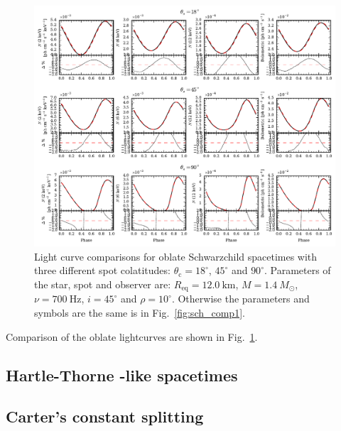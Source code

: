 \documentclass[iop, usenatbib]{emulateapj}
\newcommand{\Msun}{\ensuremath{M_{\odot}}}
\begin{document}
\begin{figure}
\centering
\includegraphics[width=18cm]{figs/fig4.pdf}
\caption{\label{fig:osch_comp700}
  Light curve comparisons for oblate Schwarzchild spacetimes with three different spot colatitudes: $\theta_{\mathrm{c}} = 18^{\circ}$, $45^{\circ}$ and $90^{\circ}$.
  Parameters of the star, spot and observer are: $R_{\mathrm{eq}} = 12.0~\mathrm{km}$, $M = 1.4~\Msun$, $\nu = 700~\mathrm{Hz}$, $i = 45^{\circ}$ and $\rho = 10^{\circ}$.
  Otherwise the parameters and symbols are the same is in Fig.~\ref{fig:sch_comp1}.
  }
\end{figure}

Comparison of the oblate lightcurves are shown in Fig.~\ref{fig:osch_comp700}.






\subsection{Hartle-Thorne -like spacetimes}




\subsection{Carter's constant splitting}
\end{document}
